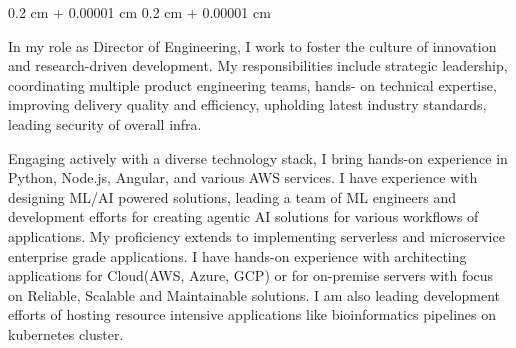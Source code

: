 \documentclass[10pt, letterpaper]{article}
\newenvironment{onecolentry}{
    \begin{adjustwidth}{
        0.2 cm + 0.00001 cm
    }{
        0.2 cm + 0.00001 cm
    }
}{
    \end{adjustwidth}
} %
\begin{document}
            \begin{onecolentry}
                
                    In my role as Director of Engineering, I work to foster the culture of innovation and research-driven development. My
responsibilities include strategic leadership, coordinating multiple product engineering teams, hands-
on technical expertise, improving delivery quality and efficiency, upholding latest industry standards,
leading security of overall infra.

Engaging actively with a diverse technology stack, I bring hands-on experience in Python, Node.js,
Angular, and various AWS services. I have experience with designing ML/AI powered solutions, leading a team of ML engineers and 
development efforts for creating agentic AI solutions for various workflows of applications. 
My proficiency extends to implementing serverless and microservice enterprise grade applications. 
I have hands-on experience with architecting applications for Cloud(AWS, Azure, GCP) or 
for on-premise servers with focus on Reliable, Scalable and Maintainable solutions. 
I am also leading development efforts of hosting resource intensive applications like bioinformatics pipelines on kubernetes cluster.


\end{onecolentry}
\end{document}
